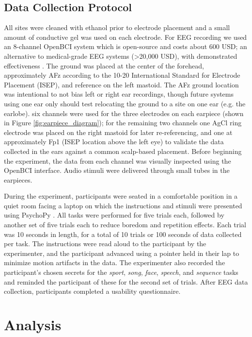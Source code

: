 \documentclass{sigchi}
\begin{document}
\subsection{Data Collection Protocol}
All sites were cleaned with ethanol prior to electrode placement and a small amount of conductive gel was used on each electrode. For EEG recording we used an 8-channel OpenBCI system \cite{michalska2009openbci} which is open-source and costs about 600 USD; an alternative to medical-grade EEG systems (\textgreater20,000 USD), with demonstrated effectiveness \cite{Frey2016}. The ground was placed at the center of the forehead, approximately AFz according to the 10-20 International Standard for Electrode Placement (ISEP), and reference on the left mastoid. The AFz ground location was intentional to not bias left or right ear recordings, though future systems using one ear only should test relocating the ground to a site on one ear (e.g. the earlobe). six channels were used for the three electrodes on each earpiece (shown in Figure \ref{fig:earpiece_diagram}); for the remaining two channels one AgCl ring electrode was placed on the right mastoid for later re-referencing, and one at approximately Fp1 (ISEP location above the left eye) to validate the data collected in the ears against a common scalp-based placement. Before beginning the experiment, the data from each channel was visually inspected using the OpenBCI interface. Audio stimuli were delivered through small tubes in the earpieces.

During the experiment, participants were seated in a comfortable position in a quiet room facing a laptop on which the instructions and stimuli were presented using PsychoPy \cite{peirce2007psychopy}. All tasks were performed for five trials each, followed by another set of five trials each to reduce boredom and repetition effects. Each trial was 10 seconds in length, for a total of 10 trials or 100 seconds of data collected per task. The instructions were read aloud to the participant by the experimenter, and the participant advanced using a pointer held in their lap to minimize motion artifacts in the data. The experimenter also recorded the participant's chosen secrets for the \textit{sport}, \textit{song}, \textit{face}, \textit{speech}, and \textit{sequence} tasks and reminded the participant of these for the second set of trials. After EEG data collection, participants completed a usability questionnaire.

\section{Analysis}
\end{document}
